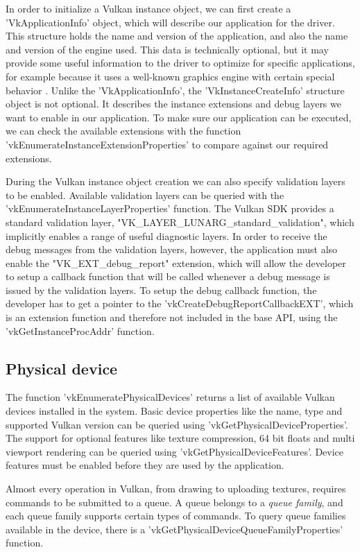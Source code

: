 In order to initialize a Vulkan instance object, we can first create a 'VkApplicationInfo' object, which will describe our application for the driver. This structure holds the name and version of the application, and also the name and version of the engine used. This data is technically optional, but it may provide some useful information to the driver to optimize for specific applications, for example because it uses a well-known graphics engine with certain special behavior \cite{vulkan_tutorial}. Unlike the 'VkApplicationInfo', the 'VkInstanceCreateInfo' structure object is not optional. It describes the instance extensions and debug layers we want to enable in our application. To make sure our application can be executed, we can check the available extensions with the function 'vkEnumerateInstanceExtensionProperties' to compare against our required extensions.

During the Vulkan instance object creation we can also specify validation layers to be enabled. Available validation layers can be queried with the 'vkEnumerateInstanceLayerProperties' function. The Vulkan SDK provides a standard validation layer, "VK\_LAYER\_LUNARG\_standard\_validation", which implicitly enables a range of useful diagnostic layers. In order to receive the debug messages from the validation layers, however, the application must also enable the "VK\_EXT\_debug\_report" extension, which will allow the developer to setup a callback function that will be called whenever a debug message is issued by the validation layers. To setup the debug callback function, the developer has to get a pointer to the 'vkCreateDebugReportCallbackEXT', which is an extension function and therefore not included in the base API, using the 'vkGetInstanceProcAddr' function.

\subsection{Physical device}
The function 'vkEnumeratePhysicalDevices' returns a list of available Vulkan devices installed in the system. Basic device properties like the name, type and supported Vulkan version can be queried using 'vkGetPhysicalDeviceProperties'. The support for optional features like texture compression, 64 bit floats and multi viewport rendering can be queried using 'vkGetPhysicalDeviceFeatures'. Device features must be enabled before they are used by the application.

Almost every operation in Vulkan, from drawing to uploading textures, requires commands to be submitted to a queue. A queue belongs to a \emph{queue family}, and each queue family supports certain types of commands. To query queue families available in the device, there is a 'vkGetPhysicalDeviceQueueFamilyProperties' function.

